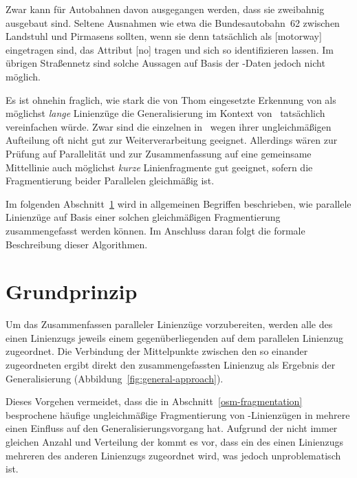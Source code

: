\documentclass[../main/thesis.tex]{subfiles}
\begin{document}
Zwar kann für Autobahnen davon ausgegangen werden, dass sie zweibahnig ausgebaut sind.
Seltene Ausnahmen wie etwa die Bundesautobahn~62 zwischen Landstuhl und Pirmasens sollten, wenn sie denn tatsächlich als [motorway] eingetragen sind, das Attribut [no] tragen und sich so identifizieren lassen.
Im übrigen Straßennetz sind solche Aussagen auf Basis der \osm-Daten jedoch nicht möglich.

Es ist ohnehin fraglich, wie stark die von Thom eingesetzte Erkennung von  als möglichst \emph{lange} Linienzüge die Generalisierung im Kontext von \osm\ tatsächlich vereinfachen würde.
Zwar sind die einzelnen  in \osm\ wegen ihrer ungleichmäßigen Aufteilung oft nicht gut zur Weiterverarbeitung geeignet.
Allerdings wären zur Prüfung auf Parallelität und zur Zusammenfassung auf eine gemeinsame Mittellinie auch möglichst \emph{kurze} Linienfragmente gut geeignet, sofern die Fragmentierung beider Parallelen gleichmäßig ist.

Im folgenden Abschnitt~\ref{ch:algorithm-principle} wird in allgemeinen Begriffen beschrieben, wie parallele Linienzüge auf Basis einer solchen gleichmäßigen Fragmentierung zusammengefasst werden können.
Im Anschluss daran folgt die formale Beschreibung dieser Algorithmen.


\section{Grundprinzip}
\label{ch:algorithm-principle}

Um das Zusammenfassen paralleler Linienzüge vorzubereiten, werden alle  des einen Linienzugs jeweils einem gegenüberliegenden  auf dem parallelen Linienzug zugeordnet.
Die Verbindung der Mittelpunkte zwischen den so einander zugeordneten  ergibt direkt den zusammengefassten Linienzug als Ergebnis der Generalisierung (Abbildung~\ref{fig:general-approach}).

Dieses Vorgehen vermeidet, dass die in Abschnitt~\ref{osm-fragmentation} besprochene häufige ungleichmäßige Fragmentierung von \osm-Linienzügen in mehrere  einen Einfluss auf den Generalisierungsvorgang hat.
Aufgrund der nicht immer gleichen Anzahl und Verteilung der  kommt es vor, dass ein  des einen Linienzugs mehreren  des anderen Linienzugs zugeordnet wird, was jedoch unproblematisch ist.
\end{document}
